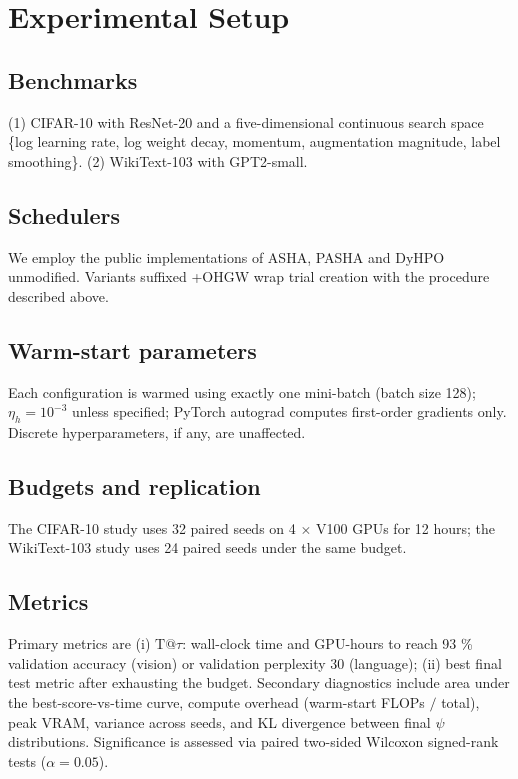 \documentclass{article}
\begin{document}
\section{Experimental Setup}
\subsection{Benchmarks}
(1) CIFAR-10 with ResNet-20 and a five-dimensional continuous search space \{log learning rate, log weight decay, momentum, augmentation magnitude, label smoothing\}. (2) WikiText-103 with GPT2-small.

\subsection{Schedulers}
We employ the public implementations of ASHA, PASHA and DyHPO \cite{bohdal-2022-pasha,wistuba-2022-supervising} unmodified. Variants suffixed +OHGW wrap trial creation with the procedure described above.

\subsection{Warm-start parameters}
Each configuration is warmed using exactly one mini-batch (batch size 128); \(\eta_h = 10^{-3}\) unless specified; PyTorch autograd computes first-order gradients only. Discrete hyperparameters, if any, are unaffected.

\subsection{Budgets and replication}
The CIFAR-10 study uses 32 paired seeds on 4 \(\times\) V100 GPUs for 12 hours; the WikiText-103 study uses 24 paired seeds under the same budget.

\subsection{Metrics}
Primary metrics are (i) \(\mathrm{T}@\tau\): wall-clock time and GPU-hours to reach 93 \% validation accuracy (vision) or validation perplexity 30 (language); (ii) best final test metric after exhausting the budget. Secondary diagnostics include area under the best-score-vs-time curve, compute overhead (warm-start FLOPs \(/\) total), peak VRAM, variance across seeds, and KL divergence between final \(\psi\) distributions. Significance is assessed via paired two-sided Wilcoxon signed-rank tests (\(\alpha = 0.05\)).
\end{document}

